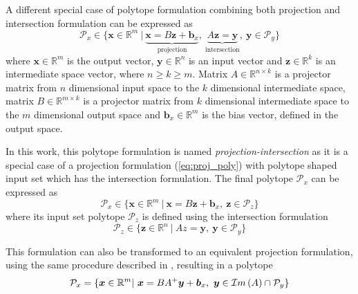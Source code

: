 A different special case of polytope formulation combining both projection and intersection formulation can be expressed as 
\begin{equation}
    \mathcal{P}_x \in \{\bm{x}\in \mathbb{R}^m~|~ \underbrace{\bm{x} = B \bm{z} + \bm{b}_x}_{\text{projection}},~ \underbrace{A\bm{z}=\bm{y}}_{\text{intersection}},~ \bm{y} \in \mathcal{P}_y\} 
    \label{eq:proj_inter_poly}
\end{equation}
where $\bm{x}\in\mathbb{R}^m$ is the output vector, $\bm{y} \in \mathbb{R}^n$ is an input vector and $\bm{z}\in\mathbb{R}^k$ is an intermediate space vector, where $n\!\geq\!k\!\geq\!m$. Matrix $A\in \mathbb{R}^{n\times k}$ is a projector matrix from $n$ dimensional input space to the $k$ dimensional intermediate space, matrix $B\in \mathbb{R}^{m\times k}$ is a projector matrix from $k$ dimensional intermediate space to the $m$ dimensional output space and $\bm{b}_x\in\mathbb{R}^m$ is the bias vector, defined in the output space.

In this work, this polytope formulation is named \textit{projection-intersection} as it is a special case of a projection formulation (\ref{eq:proj_poly}) with polytope shaped input set which has the intersection formulation. The final polytope $\mathcal{P}_x$ can be expressed as
\begin{equation}
    \mathcal{P}_x \in \{\bm{x}\in \mathbb{R}^m~|~ \bm{x} = B\bm{z} + \bm{b}_x,~ \bm{z} \in \mathcal{P}_z\} 
\end{equation}
where its input set polytope $\mathcal{P}_z$ is defined using the intersection formulation
\begin{equation}
    \mathcal{P}_z \in \{\bm{z}\in \mathbb{R}^n~|~Az = \bm{y},~ \bm{y} \in \mathcal{P}_y\} 
\end{equation}

This formulation can also be transformed to an equivalent projection formulation, using the same procedure described in , resulting in a polytope 
\begin{equation}
\mathcal{P}_x=\{\bm{x} \in \mathbb{R}^m |~ \bm{x} = BA^+\bm{y} + \bm{b}_x,~ \bm{y}\in \mathcal{I}m\left(A\right)\cap\mathcal{P}_y\} 
\end{equation}

